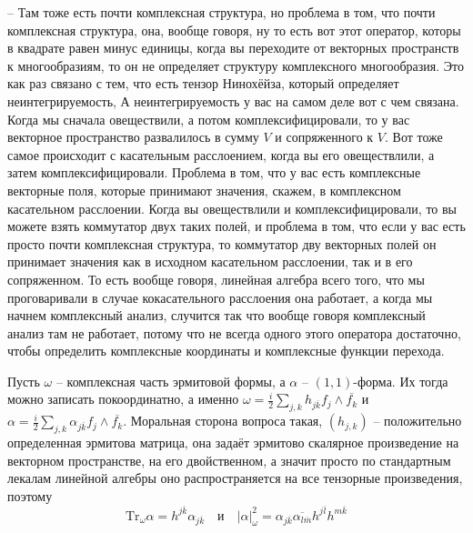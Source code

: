 – Там тоже есть почти комплексная структура, но проблема в том, что почти
комплексная структура, она, вообще говоря, ну то есть вот этот оператор, которы
в квадрате равен минус единицы, когда вы переходите от векторных пространств
к многообразиям, то он не определяет структуру комплексного многообразия. Это
как раз связано с тем, что есть тензор Нинохёйза, который определяет неинтегрируемость,
А неинтегрируемость у вас на самом деле вот с чем связана. Когда мы сначала овеществили,
а потом комплексифицировали, то у вас векторное пространство развалилось в сумму $V$
и сопряженного к $V$. Вот тоже самое происходит с касательным расслоением, когда вы
его овеществлили, а затем комплексифицировали. Проблема в том, что у вас есть
комплексные векторные поля, которые принимают значения, скажем, в комплексном
касательном расслоении. Когда вы овеществлили и комплексифицировали, то вы можете
взять коммутатор двух таких полей, и проблема в том, что если у вас есть просто
почти комплексная структура, то коммутатор дву векторных полей он принимает
значения как в исходном касательном расслоении, так и в его сопряженном. То есть
вообще говоря, линейная алгебра всего того, что мы проговаривали в случае
кокасательного расслоения она работает, а когда мы начнем комплексный анализ,
случится так что вообще говоря комплексный анализ там не работает, потому что не
всегда одного этого оператора достаточно, чтобы определить комплексные координаты
и комплексные функции перехода.


Пусть $\omega$ – комплексная часть эрмитовой формы, а $\alpha$ – $(1,1)$-форма.
Их тогда можно записать покоординатно, а именно $\omega=\frac{i}{2}
\sum_{j,k}h_{j\overline k}f_j\wedge\overline{f_k}$ и $\alpha=\frac{i}{2}\sum_{j,k}
\alpha_{j\overline k}f_j\wedge\overline{f_k}$. Моральная сторона вопроса такая,
$(h_{j,k})$ – положительно определенная эрмитова матрица, она задаёт эрмитово
скалярное произведение на векторном пространстве, на его двойственном, а значит
просто по стандартным лекалам линейной алгебры оно распространяется на все
тензорные произведения, поэтому
\[\text{Tr}_\omega\alpha=h^{j\overline k}\alpha_{j\overline k}\quad\text{и}\quad|\alpha|^2_\omega=\alpha_{j\overline k}\overline{\alpha_{l\overline m}}
h^{j\overline l}h^{m\overline k} \]
